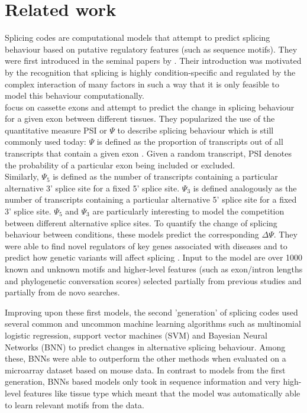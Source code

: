 \chapter{\label{ch:3-relatedwork}Related work}

Splicing codes are computational models that attempt to predict splicing behaviour based on putative regulatory features (such as sequence motifs).
They were first introduced in the seminal papers by \cite{barash2010a}\cite{barash2010b}. Their introduction was motivated by the recognition that splicing is highly condition-specific and regulated by the complex interaction of many factors in such a way that it is only feasible to model this behaviour computationally.\\
\cite{barash2010a} focus on cassette exons and attempt to predict the change in splicing behaviour for a given exon between different tissues. They popularized the use of the quantitative measure PSI or $\Psi$ to describe splicing behaviour which is still commonly used today:
$\Psi$ is defined as the proportion of transcripts out of all transcripts that contain a given exon \cite{psi}. Given a random transcript, PSI denotes the probability of a particular exon being included or excluded.\\
Similarly, $\Psi_5$ is defined as the number of transcripts containing a particular alternative 3' splice site for a fixed 5' splice site. $\Psi_3$ is defined analogously as the number of transcripts containing a particular alternative 5' splice site for a fixed 3' splice site. $\Psi_5$ and $\Psi_3$ are particularly interesting to model the competition between different alternative splice sites.
To quantify the change of splicing behaviour between conditions, these models predict the corresponding $\Delta \Psi$. They were able to find novel regulators of key genes associated with diseases and to predict how genetic variants will affect splicing \cite{splicingcodegood1} \cite{splicingcodegood2}. Input to the model are over 1000 known and unknown motifs and higher-level features (such as exon/intron lengths and phylogenetic conversation scores) selected partially from previous studies and partially from de novo searches.


Improving upon these first models, the second 'generation' of splicing codes used several common and uncommon machine learning algorithms such as multinomial logistic regression, support vector machines (SVM) and Bayesian Neural Networks (BNN) to predict changes in alternative splicing behaviour. \cite{bnnsplicing} Among these, BNNs were able to outperform the other methods when evaluated on a microarray dataset based on mouse data. In contrast to models from the first generation, BNNs based models only took in sequence information and very high-level features like tissue type which meant that the model was automatically able to learn relevant motifs from the data.


